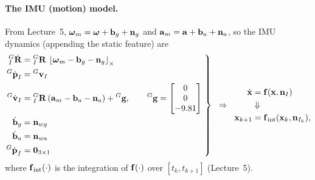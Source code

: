 \paragraph{The IMU (motion) model.} From Lecture~5, $\vect{\omega}_m = \vect{\omega} + \vect{b}_g + \vect{n}_g$ and $\vect{a}_m = \vect{a} + \vect{b}_a + \vect{n}_a$, so the IMU dynamics (appending the static feature) are
\begin{align}
\left.
\begin{aligned}
{}^{G}_{I}\dot{\vect{R}} &= {}^{G}_{I}\vect{R}\,\skewsym{\vect{\omega}_m - \vect{b}_g - \vect{n}_g} \\
{}^{G}\dot{\vect{p}}_I &= {}^{G}\vect{v}_I \\
{}^{G}\dot{\vect{v}}_I &= {}^{G}_{I}\vect{R}\,(\vect{a}_m - \vect{b}_a - \vect{n}_a) + {}^{G}\vect{g},
\qquad {}^{G}\vect{g} = \begin{bmatrix} 0 \\ 0 \\ -9.81 \end{bmatrix} \\
\dot{\vect{b}}_g &= \vect{n}_{wg} \\
\dot{\vect{b}}_a &= \vect{n}_{wa} \\
{}^{G}\dot{\vect{p}}_f &= \vect{0}_{3\times1}
\end{aligned}
\;\right\}
\;\;\Rightarrow\;\;
\begin{aligned}
\dot{\vect{x}} &= \vect{f}(\vect{x}, \vect{n}_I) \\
&\Downarrow \\
\vect{x}_{k+1} &= \vect{f}_{\mathrm{int}}(\vect{x}_k, \vect{n}_{I_k}),
\end{aligned}
\end{align}
where $\vect{f}_{\mathrm{int}}(\cdot)$ is the integration of $\vect{f}(\cdot)$ over $[t_k, t_{k+1}]$ (Lecture~5).

